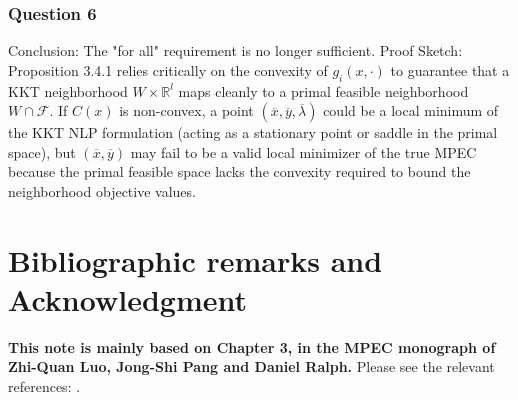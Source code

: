 \documentclass[pdflatex,sn-mathphys-num]{sn-jnl}%
\theoremstyle{definition}
\begin{document}
\subsubsection*{Question 6}
Conclusion: The "for all" requirement is no longer sufficient.
Proof Sketch: Proposition 3.4.1 relies critically on the convexity of $g_i(x,\cdot)$ to guarantee that a KKT neighborhood $W \times \mathbb{R}^l$ maps cleanly to a primal feasible neighborhood $W \cap \mathcal{F}$. If $C(x)$ is non-convex, a point $(\overline{x}, \overline{y}, \overline{\lambda})$ could be a local minimum of the KKT NLP formulation (acting as a stationary point or saddle in the primal space), but $(\overline{x}, \overline{y})$ may fail to be a valid local minimizer of the true MPEC because the primal feasible space lacks the convexity required to bound the neighborhood objective values.

\section{Bibliographic remarks and Acknowledgment}

\textbf{This note is mainly based on Chapter 3, in the MPEC monograph of Zhi-Quan Luo, Jong-Shi Pang and Daniel Ralph.} Please see the relevant references: 
\cite{falk1995bilevel,
aghasi2025fully,
hong2023two,
kovccvara1994optimization,
chaudet2020shape,
liu2023auxiliary,
liu2025bidirectional,
outrata1995numerical,
cui2023complexity,
christof2020nonsmooth,
rawat2026augmented,
robinson1980strongly,
chen2025control,
shin2023near,
bolte2024differentiating,
nghia2025geometric,
wang2025analysis,
chen2025aubin,
liu2024auxiliary,
kojima1980strongly,
chen2026characterizations,
cui2026lipschitz,
shin2022exponential,
de2023function,
bank1982d,
wang2026algebraic,
bonnans1994local,
khanh2024globally,
chen2025two,
mohammadi2022variational,
dussault2026polyhedral,
gowda1994stability,
liu2025learning,
qi2000constant,
facchinei1998accurate,
jittorntrum2009solution,
kyparisis1992parametric,
liu1995sensitivity,
pang11995stability,
liu2025risk,
liu2024feasibility,
qiu1992sensitivity,
aussel2024variational,
reinoza1985strong,
facchinei2003finite,
harker1990finite,
kyparisis1990sensitivity,
wang2025multi,
kleinmichel1972av,
ortega2000iterative,
wang2025analysis1,
bai2021matrix,
lin2026hierarchical,
gao2022rolling,
gander2026landmarks,
mishchenko2023regularized,
han2025low,
wang2022newton,
robinson2009generalized,
mordukhovich2023globally,
wang2026damage,
robinson2009local,
shuo2026lecture,lin2023monotone,yu2026optimization,liang2025squared,jongen1987inertia,guddat1990parametric,bellon2024time,tang2022running,liu2025new,josephy1979newton,si2024riemannian,yu2026optimization1,longman2023method,yao2023relative,han2024continuous,ha1987application,yu2026pattern,kojima2009continuous,seguin2022continuation,liu1995perturbation,pang1996piecewise,liu2022iterative,eikenbroek2022improving,ralph1995directional,yu2026optimization2,scheel2000mathematical,bonnans1992developpement,bonnans1992expansion,dempe1993directional,liu2023iterative,shapiro1988sensitivity,pang1990newton,robinson1991implicit,zheng2025enhanced,hang2025smoothness,hang2024role,scholtes2012introduction,cui2022nonconvex}. 

 
\end{document}
